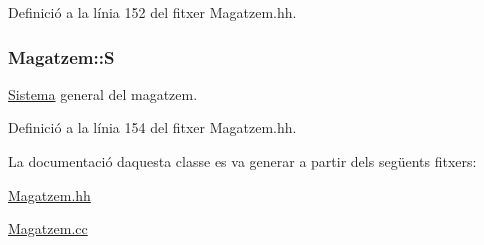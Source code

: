 Definició a la línia 152 del fitxer Magatzem.\+hh.

\subsubsection[{\texorpdfstring{S}{S}}]{ Magatzem\+::S\hspace{0.3cm}{\ttfamily [private]}}\hypertarget{class_magatzem_ab0a587e18675ddc6a0b1bf08a1b6e6a2}{}\label{class_magatzem_ab0a587e18675ddc6a0b1bf08a1b6e6a2}


\hyperlink{class_sistema}{Sistema} general del magatzem. 



Definició a la línia 154 del fitxer Magatzem.\+hh.



La documentació d\textquotesingle{}aquesta classe es va generar a partir dels següents fitxers\+:\begin{DoxyCompactItemize}
\item 
\hyperlink{_magatzem_8hh}{Magatzem.\+hh}\item 
\hyperlink{_magatzem_8cc}{Magatzem.\+cc}\end{DoxyCompactItemize}
